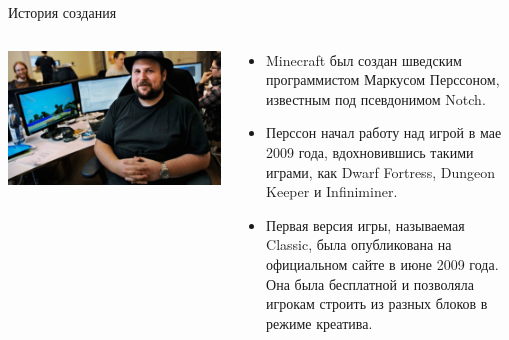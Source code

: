 \documentclass[handout]{beamer}
\begin{document}
    \begin{frame}{История создания}
        \begin{columns}
            \begin{column}{0.42\textwidth}
                \includegraphics[width=\textwidth]{img/markus.jpg}
            \end{column}
            \begin{column}{0.7\textwidth}
                \begin{itemize}
                    \item Minecraft был создан шведским программистом Маркусом Перссоном, известным под псевдонимом Notch.
                    \item Перссон начал работу над игрой в мае 2009 года, вдохновившись такими играми, как Dwarf Fortress, Dungeon Keeper и Infiniminer.
                    \item Первая версия игры, называемая Classic, была опубликована на официальном сайте в июне 2009 года. Она была бесплатной и позволяла игрокам строить из разных блоков в режиме креатива.
                \end{itemize}
            \end{column}
        \end{columns}
    \end{frame}
\end{document}
